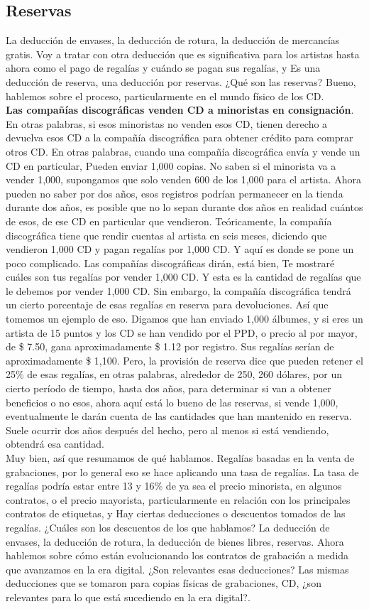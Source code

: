\documentclass[10pt]{book}
\begin{document}
\subsection{Reservas}
La deducción de envases, la deducción de rotura, la deducción de mercancías gratis. Voy a tratar con otra deducción que es significativa para los artistas hasta ahora como el pago de regalías y cuándo se pagan sus regalías, y Es una deducción de reserva, una deducción por reservas. ¿Qué son las reservas? Bueno, hablemos sobre el proceso, particularmente en el mundo físico de los CD. \\
\textbf{Las compañías discográficas venden CD a minoristas en consignación}. En otras palabras, si esos minoristas no venden esos CD, tienen derecho a devuelva esos CD a la compañía discográfica para obtener crédito para comprar otros CD. En otras palabras, cuando una compañía discográfica envía y vende un CD en particular, Pueden enviar 1,000 copias. No saben si el minorista va a vender 1,000, supongamos que solo venden 600 de los 1,000 para el artista. Ahora pueden no saber por dos años, esos registros podrían permanecer en la tienda durante dos años, es posible que no lo sepan durante dos años en realidad cuántos de esos, de ese CD en particular que vendieron. Teóricamente, la compañía discográfica tiene que rendir cuentas al artista en seis meses, diciendo que vendieron 1,000 CD y pagan regalías por 1,000 CD. Y aquí es donde se pone un poco complicado. Las compañías discográficas dirán, está bien, Te mostraré cuáles son tus regalías por vender 1,000 CD.  Y esta es la cantidad de regalías que le debemos por vender 1,000 CD. Sin embargo, la compañía discográfica tendrá un cierto porcentaje de esas regalías en reserva para devoluciones. Así que tomemos un ejemplo de eso. Digamos que han enviado 1,000 álbumes, y si eres un artista de 15 puntos y los CD se han vendido por el PPD, o precio al por mayor, de \$ 7.50, gana aproximadamente \$ 1.12 por registro. Sus regalías serían de aproximadamente \$ 1,100. Pero, la provisión de reserva dice que pueden retener el 25\% de esas regalías, en otras palabras, alrededor de 250, 260 dólares, por un cierto período de tiempo, hasta dos años, para determinar si van a obtener beneficios o no esos, ahora aquí está lo bueno de las reservas, si vende 1,000, eventualmente le darán cuenta de las cantidades que han mantenido en reserva. Suele ocurrir dos años después del hecho, pero al menos si está vendiendo, obtendrá esa cantidad.\\
Muy bien, así que resumamos de qué hablamos. Regalías basadas en la venta de grabaciones, por lo general eso se hace aplicando una tasa de regalías. La tasa de regalías podría estar entre 13 y 16\% de ya sea el precio minorista, en algunos contratos, o el precio mayorista, particularmente en relación con los principales contratos de etiquetas, y Hay ciertas deducciones o descuentos tomados de las regalías. ¿Cuáles son los descuentos de los que hablamos? La deducción de envases, la deducción de rotura, la deducción de bienes libres, reservas. Ahora hablemos sobre cómo están evolucionando los contratos de grabación a medida que avanzamos en la era digital. ¿Son relevantes esas deducciones? Las mismas deducciones que se tomaron para copias físicas de grabaciones, CD, ¿son relevantes para lo que está sucediendo en la era digital?.
\end{document}
